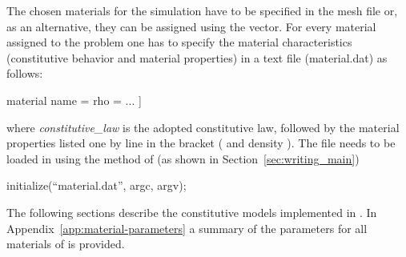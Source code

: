 The chosen materials for the simulation have to be specified in the
mesh file or, as an alternative, they can be assigned using the
 vector.  For every material assigned to the
problem one has to specify the material characteristics (constitutive
behavior and material properties) in a text file (\eg material.dat) as
follows:
\begin{cpp}
  material %
  name = %
  rho = %
  ...
  ]
\end{cpp}
 where \emph{constitutive\_law} is the
adopted constitutive law, followed by the material properties listed
one by line in the bracket (\eg {} and density
). The file needs to be loaded in \akantu using the
 method of \akantu (as shown in Section~\ref{sec:writing_main})
\begin{cpp}
initialize(``material.dat'', argc, argv);
\end{cpp}
The following sections describe the constitutive models implemented in
\akantu. In Appendix~\ref{app:material-parameters} a summary of the
parameters for all materials of \akantu is provided.

